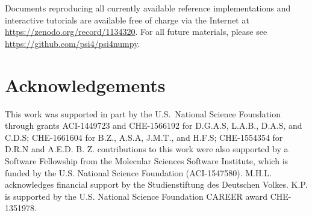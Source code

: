 \section{}
Documents reproducing all currently available reference implementations and interactive tutorials are available free of charge via the Internet at \url{https://zenodo.org/record/1134320}. For all future materials, please see \url{https://github.com/psi4/psi4numpy}.

\section{Acknowledgements}
This work was supported in part by the U.S.~National Science Foundation through grants ACI-1449723 and CHE-1566192 for D.G.A.S, L.A.B., D.A.S, and C.D.S; CHE-1661604 for B.Z., A.S.A, J.M.T., and H.F.S; CHE-1554354 for D.R.N and A.E.D. B. Z. contributions to this work were also supported by a Software Fellowship from the Molecular Sciences Software Institute, which is funded by the U.S. National Science Foundation (ACI-1547580).  M.H.L. acknowledges financial support by the Studienstiftung des Deutschen Volkes. K.P.  is supported by the U.S. National Science Foundation CAREER award CHE-1351978.
